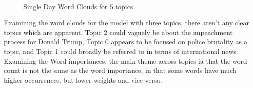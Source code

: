 \begin{figure}[H]
	\centering
\end{figure}
\begin{figure}[H]
	\centering
	\ContinuedFloat
	\\
	
	\caption{Single Day Word Clouds for 5 topics}
	\label{fig:single3}
\end{figure}

Examining the word clouds for the model with three topics, there aren't any clear topics which are apparent. Topic 2 could vaguely be about the impeachment process for Donald Trump, Topic 0 appears to be focused on police brutality as a topic, and Topic 1 could broadly be referred to in terms of international news. Examining the Word importances, the main theme across topics ia that the word count is not the same as the word importance, in that some words have much higher occurrences, but lower weights and vice versa.

